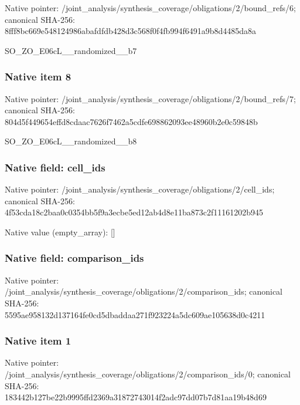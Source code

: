 \documentclass[10pt,a4paper]{article}
\begin{document}
Native pointer: /joint\_analysis/synthesi\allowbreak{}s\_coverage/obligations/2\allowbreak{}/bound\_refs/6; canonical SHA-256: 8fff8bc669e548124986abaf\allowbreak{}dfdb428d3c568f0f4fb994f6\allowbreak{}491a9b8d4485da8a


SO\_ZO\_E06cL\_\_randomized\_\_b7


\subsubsection{Native item 8}


Native pointer: /joint\_analysis/synthesi\allowbreak{}s\_coverage/obligations/2\allowbreak{}/bound\_refs/7; canonical SHA-256: 804d5f449654effd8cdaac76\allowbreak{}26f7462a5cdfe698862093ee\allowbreak{}48960b2e0c59848b


SO\_ZO\_E06cL\_\_randomized\_\_b8


\subsubsection{Native field: cell\_ids}


Native pointer: /joint\_analysis/synthesi\allowbreak{}s\_coverage/obligations/2\allowbreak{}/cell\_ids; canonical SHA-256: 4f53cda18c2baa0c0354bb5f\allowbreak{}9a3ecbe5ed12ab4d8e11ba87\allowbreak{}3c2f11161202b945



Native value (empty\_array): []



\subsubsection{Native field: comparison\_ids}


Native pointer: /joint\_analysis/synthesi\allowbreak{}s\_coverage/obligations/2\allowbreak{}/comparison\_ids; canonical SHA-256: 5595ae958132d137164fe0cd\allowbreak{}5dbaddaa271f923224a5dc60\allowbreak{}9ae105638d0c4211



\subsubsection{Native item 1}


Native pointer: /joint\_analysis/synthesi\allowbreak{}s\_coverage/obligations/2\allowbreak{}/comparison\_ids/0; canonical SHA-256: 183442b127be22b9995ffd23\allowbreak{}69a31872743014f2adc97dd0\allowbreak{}7b7d81aa19b48d69
\end{document}
